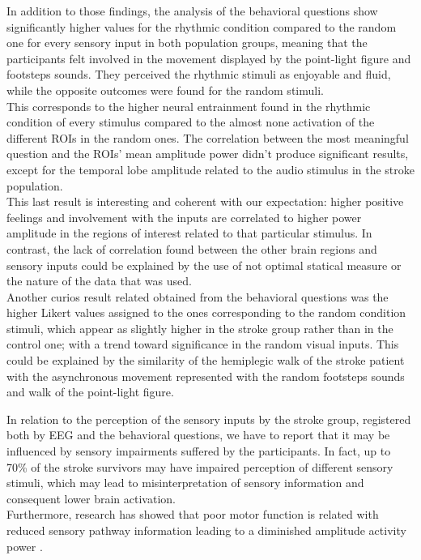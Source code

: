 In addition to those findings, the analysis of the behavioral questions show significantly higher values for the rhythmic condition compared to the random one for every sensory input in both population groups, meaning that the participants felt involved in the movement displayed by the point-light figure and footsteps sounds. They perceived the rhythmic stimuli as enjoyable and fluid, while the opposite outcomes were found for the random stimuli. \\
This corresponds to the higher neural entrainment found in the rhythmic condition of every stimulus compared to the almost none activation of the different ROIs in the random ones. The correlation between the most meaningful question and the ROIs' mean amplitude power didn't produce significant results, except for the temporal lobe amplitude related to the audio stimulus in the stroke population. \\
This last result is interesting and coherent with our expectation: higher positive feelings and involvement with the inputs are correlated to higher power amplitude in the regions of interest related to that particular stimulus. In contrast, the lack of correlation found between the other brain regions and sensory inputs could be explained by the use of not optimal statical measure or the nature of the data that was used.\\
Another curios result related obtained from the behavioral questions was the higher Likert values assigned to the ones corresponding to the random condition stimuli, which appear as slightly higher in the stroke group rather than in the control one; with a trend toward significance in the random visual inputs. This could be explained by the similarity of the hemiplegic walk of the stroke patient with the asynchronous movement represented with the random footsteps sounds and walk of the point-light figure.   

In relation to the perception of the sensory inputs by the stroke group, registered both by EEG and the behavioral questions, we have to report that it may be influenced by sensory impairments suffered by the participants. In fact, up to 70\% of the stroke survivors may have impaired perception of different sensory stimuli, which may lead to misinterpretation of sensory information \parencite{Hazelton_2022} and consequent lower brain activation. \\
Furthermore, research has showed that poor motor function is related with reduced sensory pathway information leading to a diminished amplitude activity power \parencite{Campfens_2015}.

